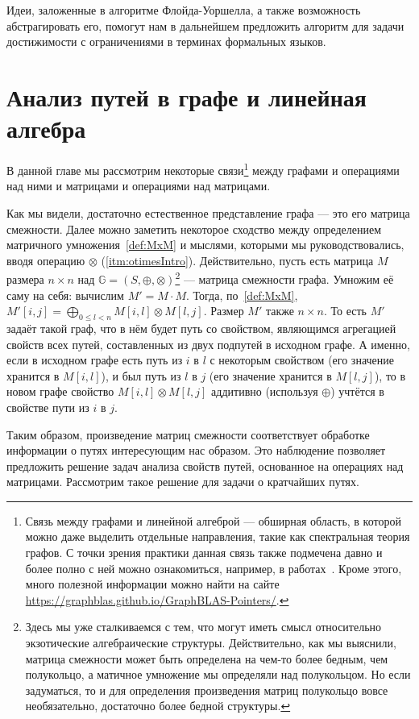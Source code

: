 Идеи, заложенные в алгоритме Флойда-Уоршелла, а также возможность абстрагировать его, помогут нам в дальнейшем предложить алгоритм для задачи достижимости с ограничениями в терминах формальных языков.


\section{Анализ путей в графе и линейная алгебра}

В данной главе мы рассмотрим некоторые связи\footnote{Связь между графами и линейной алгеброй --- обширная область, в которой можно даже выделить отдельные направления, такие как спектральная теория графов. С точки зрения практики данная связь также подмечена давно и более полно с ней можно ознакомиться, например, в работах~\cite{doi:10.1137/1.9780898719918, Davis2018Algorithm9S}. Кроме этого, много полезной информации можно найти на сайте \url{https://graphblas.github.io/GraphBLAS-Pointers/}.} между графами и операциями над ними и матрицами и операциями над матрицами.

Как мы видели, достаточно естественное представление графа --- это его матрица смежности. Далее можно заметить некоторое сходство между определением матричного умножения~\ref{def:MxM} и мыслями, которыми мы руководствовались, вводя операцию $\otimes$ (\ref{itm:otimesIntro}).
Действительно, пусть есть матрица $M$ размера $n \times n$ над $\mathbb{G} = (S,\oplus,\otimes)$\footnote{Здесь мы уже сталкиваемся с тем, что могут иметь смысл относительно экзотические алгебраические структуры. Действительно, как мы выяснили, матрица смежности может быть определена на чем-то более бедным, чем полукольцо, а матичное умножение мы определяли над полукольцом. Но если задуматься, то и для определения произведения матриц полукольцо вовсе необязательно, достаточно более бедной структуры.} --- матрица смежности графа. Умножим её саму на себя: вычислим $M'= M \cdot M$. Тогда, по~\ref{def:MxM}, $M'[i,j] = \bigoplus_{0 \leq l < n} M[i,l] \otimes M[l,j]$. Размер $M'$ также $n \times n$. То есть $M'$ задаёт такой граф, что в нём будет путь со свойством, являющимся агрегацией свойств всех путей, составленных из двух подпутей в исходном графе. А именно, если в исходном графе есть путь из $i$ в $l$ с некоторым свойством (его значение хранится в $M[i,l]$), и был путь из $l$ в $j$ (его значение хранится в $M[l,j]$), то в новом графе свойство $M[i,l] \otimes M[l,j]$ аддитивно (используя $\oplus$) учтётся в свойстве пути из $i$ в $j$.

Таким образом, произведение матриц смежности соответствует обработке информации о путях интересующим нас образом. Это наблюдение позволяет предложить решение задач анализа свойств путей, основанное на операциях над матрицами. Рассмотрим такое решение для задачи о кратчайших путях.

